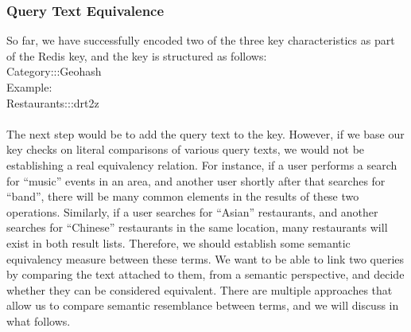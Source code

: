 \subsubsection{Query Text Equivalence}
So far, we have successfully encoded two of the three key characteristics as part of the Redis key, and the key is structured as follows:\\
Category:::Geohash\\
Example:\\
Restaurants:::drt2z\\\\
The next step would be to add the query text to the key. However, if we base our key checks on literal comparisons of various query texts, we would not be establishing a real equivalency relation. For instance, if a user performs a search for ``music'' events in an area, and another user shortly after that searches for ``band'', there will be many common elements in the results of these two operations. Similarly, if a user searches for ``Asian'' restaurants, and another searches for ``Chinese'' restaurants in the same location, many restaurants will exist in both result lists. Therefore, we should establish some semantic equivalency measure between these terms.
We want to be able to link two queries by comparing the text attached to them, from a semantic perspective, and decide whether they can be considered equivalent. There are multiple approaches that allow us to compare semantic resemblance between terms, and we will discuss in what follows.
\newpage
